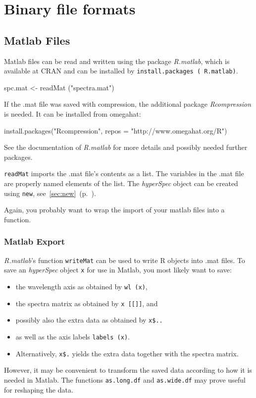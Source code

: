 \documentclass[english, a4paper, 10pt, headings=small, DIV11]{scrartcl}
\renewenvironment{Schunk}{\vspace{0pt}\begin{small}}{\end{small}\vspace{0pt}}
\newcommand{\Rcode}[2][]{\texorpdfstring{\nohyphens{#1\texttt{#2}}}{#2}}
\newcommand{\Robject}[2][]{\texorpdfstring{\nohyphens{#1\texttt{#2}}}{#2}}
\newcommand{\Rfunction}[2][]{\texorpdfstring{\nohyphens{#1\texttt{#2}}}{#2}}
\newcommand{\Rpackage}[1]{\texorpdfstring{\nohyphens{\textit{#1}}}{#1}}
\newcommand{\Rclass}[1]{\texorpdfstring{\nohyphens{\textit{#1}}}{#1}}
\newcommand{\chy}{\Rclass{hyperSpec}\xspace}
\begin{document}
\section{Binary file formats}
\label{sec:binary-file-formats}

\subsection{Matlab Files}
\label{sec:readMat}
Matlab files can be read and written using the package \Rpackage{R.matlab}\citep{R.matlab},
which is available at CRAN and can be installed by \Rcode{install.packages (\textquotedbl
R.matlab\textquotedbl)}.
\begin{Schunk}
  \begin{Sinput}
spc.mat <- readMat ("spectra.mat")
\end{Sinput}
\end{Schunk}

If the .mat file was saved with compression, the additional package \Rpackage{Rcompression} is
needed. It can be installed from omegahat:
\begin{Schunk}
  \begin{Sinput}
install.packages("Rcompression", repos = "http://www.omegahat.org/R")
\end{Sinput}
\end{Schunk}
See the documentation of \Rpackage{R.matlab} for more details and possibly needed further packages.

\Rfunction{readMat} imports the .mat file's contents as a list. The variables in the .mat file are
properly named elements of the list. The \chy object can be created using \Rfunction{new},
see~\ref{sec:new}~(p.~\pageref{sec:new}).

Again, you probably want to wrap the import of your matlab files into a function.

\subsubsection{Matlab Export}
\label{sec:writing-matlab-files}
\Rpackage{R.matlab}'s function \Rfunction{writeMat} can be used to write R objects into .mat files.
To save an \chy object \Robject{x} for use in Matlab, you most likely want to save:
\begin{itemize}
\item the wavelength axis as obtained by \Rcode{wl (x)},
\item the spectra matrix as obtained by \Rcode{x [[]]}, and
\item possibly also the extra data as obtained by \Rcode{x\$..}
\item as well as the axis labels \Rcode{labels (x)}.
\item Alternatively, \Rcode{x\$.} yields the extra data together with the spectra matrix.
\end{itemize}
However, it may be convenient to transform the saved data according to how it is needed in Matlab.
The functions \Rfunction{as.long.df} and \Rfunction{as.wide.df} may prove useful for reshaping the
data.
\end{document}
